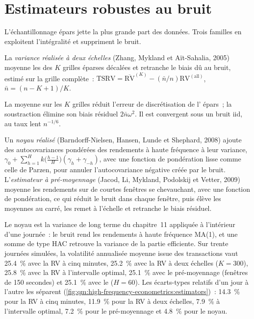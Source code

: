 \section{Estimateurs robustes au bruit}

L'échantillonnage épars jette la plus grande part des données. Trois familles en exploitent l'intégralité et suppriment le bruit.

\begin{definition}\label{def:qm:high-frequency-econometrics:tsrv}
La \emph{variance réalisée à deux échelles} (Zhang, Mykland et Aït-Sahalia, 2005) moyenne les  des $K$ grilles éparses décalées
et retranche le biais dû au bruit, estimé sur la grille complète~: $\mathrm{TSRV} = \overline{\mathrm{RV}}^{(K)} - (\bar n/n)\mathrm{RV}^{(\mathrm{all})}$, $\bar n = (n - K + 1)/K$.
\end{definition}

La moyenne sur les $K$ grilles réduit l'erreur de discrétisation de l' épars~; la soustraction élimine son biais résiduel $2\bar n\omega^2$. Il est convergent
sous un bruit iid, au taux lent $n^{-1/6}$.

\begin{definition}\label{def:qm:high-frequency-econometrics:kernel}
Un \emph{noyau réalisé} (Barndorff-Nielsen, Hansen, Lunde et Shephard, 2008) ajoute des autocovariances pondérées des rendements à haute fréquence à leur
variance, $\gamma_0 + \sum_{h=1}^Hk\bigl(\frac{h-1}H\bigr)(\gamma_h + \gamma_{-h})$, avec une fonction de pondération lisse comme celle de Parzen, pour annuler l'autocovariance négative créée par le bruit.
L'\emph{estimateur à pré-moyennage} (Jacod, Li, Mykland, Podolskij et Vetter, 2009) moyenne les rendements sur de courtes fenêtres se chevauchant, avec une
fonction de pondération, ce qui réduit le bruit dans chaque fenêtre, puis élève les moyennes au carré, les remet à l'échelle et retranche le biais résiduel.
\end{definition}

Le noyau est la variance de long terme du chapitre~11 appliquée à l'intérieur d'une journée~: le bruit rend les rendements à haute fréquence MA(1), et une somme de type HAC retrouve la variance de la
partie efficiente. Sur trente journées simulées, la volatilité annualisée moyenne issue des transactions vaut 25.4~\% avec la RV à cinq minutes, 25.2~\% avec la RV à deux échelles ($K = 300$), 25.8~\% avec la RV à
l'intervalle optimal, 25.1~\% avec le pré-moyennage (fenêtres de 150 secondes) et 25.1~\% avec le  ($H = 60$). Les écarts-types relatifs d'un jour à l'autre les séparent
(\cref{fig:qm:high-frequency-econometrics:estimators})~: 14.3~\% pour la RV à cinq minutes, 11.9~\% pour la RV à deux échelles, 7.9~\% à l'intervalle optimal, 7.2~\% pour le pré-moyennage et 4.8~\% pour le
noyau.

